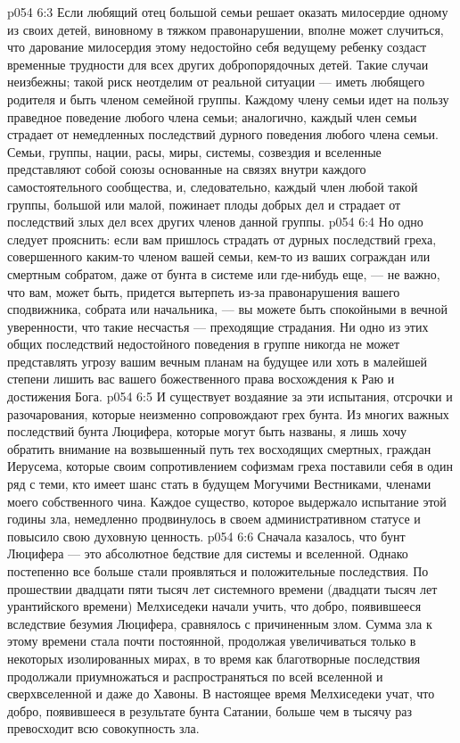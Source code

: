 \vs p054 6:3 \pc Если любящий отец большой семьи решает оказать милосердие одному из своих детей, виновному в тяжком правонарушении, вполне может случиться, что дарование милосердия этому недостойно себя ведущему ребенку создаст временные трудности для всех других добропорядочных детей. Такие случаи неизбежны; такой риск неотделим от реальной ситуации --- иметь любящего родителя и быть членом семейной группы. Каждому члену семьи идет на пользу праведное поведение любого члена семьи; аналогично, каждый член семьи страдает от немедленных последствий дурного поведения любого члена семьи. Семьи, группы, нации, расы, миры, системы, созвездия и вселенные представляют собой союзы основанные на связях внутри каждого самостоятельного сообщества, и, следовательно, каждый член любой такой группы, большой или малой, пожинает плоды добрых дел и страдает от последствий злых дел всех других членов данной группы.
\vs p054 6:4 Но одно следует прояснить: если вам пришлось страдать от дурных последствий греха, совершенного каким\hyp{}то членом вашей семьи, кем\hyp{}то из ваших сограждан или смертным собратом, даже от бунта в системе или где\hyp{}нибудь еще, --- не важно, что вам, может быть, придется вытерпеть из\hyp{}за правонарушения вашего сподвижника, собрата или начальника, --- вы можете быть спокойными в вечной уверенности, что такие несчастья --- преходящие страдания. Ни одно из этих общих последствий недостойного поведения в группе никогда не может представлять угрозу вашим вечным планам на будущее или хоть в малейшей степени лишить вас вашего божественного права восхождения к Раю и достижения Бога.
\vs p054 6:5 И существует воздаяние за эти испытания, отсрочки и разочарования, которые неизменно сопровождают грех бунта. Из многих важных последствий бунта Люцифера, которые могут быть названы, я лишь хочу обратить внимание на возвышенный путь тех восходящих смертных, граждан Иерусема, которые своим сопротивлением софизмам греха поставили себя в один ряд с теми, кто имеет шанс стать в будущем Могучими Вестниками, членами моего собственного чина. Каждое существо, которое выдержало испытание этой годины зла, немедленно продвинулось в своем административном статусе и повысило свою духовную ценность.
\vs p054 6:6 \pc Сначала казалось, что бунт Люцифера --- это абсолютное бедствие для системы и вселенной. Однако постепенно все больше стали проявляться и положительные последствия. По прошествии двадцати пяти тысяч лет системного времени (двадцати тысяч лет урантийского времени) Мелхиседеки начали учить, что добро, появившееся вследствие безумия Люцифера, сравнялось с причиненным злом. Сумма зла к этому времени стала почти постоянной, продолжая увеличиваться только в некоторых изолированных мирах, в то время как благотворные последствия продолжали приумножаться и распространяться по всей вселенной и сверхвселенной и даже до Хавоны. В настоящее время Мелхиседеки учат, что добро, появившееся в результате бунта Сатании, больше чем в тысячу раз превосходит всю совокупность зла.
